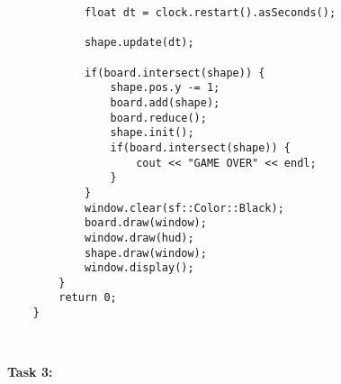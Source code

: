 \documentclass[11pt]{amsart}
\begin{document}
\begin{verbatim}
	        float dt = clock.restart().asSeconds();

	        shape.update(dt);

	        if(board.intersect(shape)) {
	            shape.pos.y -= 1;
	            board.add(shape);
	            board.reduce();
	            shape.init();
	            if(board.intersect(shape)) {
	                cout << "GAME OVER" << endl;
	            }
	        }
	        window.clear(sf::Color::Black);
	        board.draw(window);
	        window.draw(hud);
	        shape.draw(window);
	        window.display();
	    }
	    return 0;
	}



\end{verbatim}


\textbf{Task 3:} \\
\end{document}
